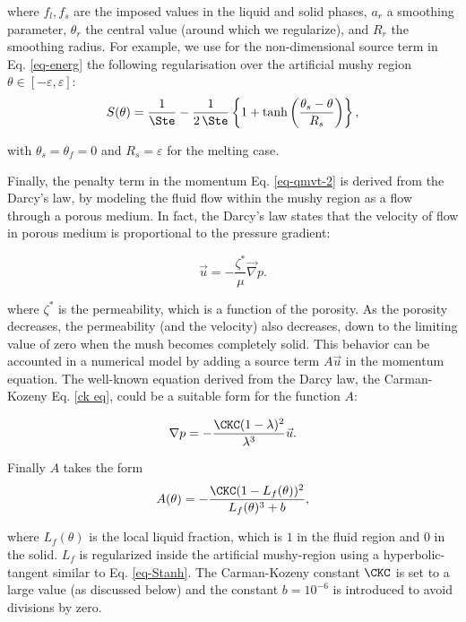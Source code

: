 \noindent where $f_l, f_s$ are the imposed values in the liquid and solid phases, $a_r$ a smoothing  parameter, $\theta_r$ the central value (around which we regularize), and $R_r$ the smoothing radius. For example, we use for the non-dimensional source term in Eq. \ref{eq-energ} the following regularisation over the artificial mushy region $\theta \in [-\varepsilon, \varepsilon]$:
\begin{equation}
S(\theta) = \frac{1}{\Ste} - \frac{1}{2\,\Ste}\left\{
1 + \tanh\left(\frac{\theta_s-\theta}{R_s}\right)
\right\},
\label{eq-Stanh}
\end{equation} 

\noindent with $\theta_s=\theta_f=0$ and $R_s=\varepsilon$ for the melting case. 

Finally, the penalty term in the momentum Eq. \ref{eq-qmvt-2} is derived from the Darcy's law, by modeling the fluid flow within the mushy region as a flow through a porous medium.
In fact, the Darcy's law states that the velocity of flow in porous medium is proportional to the pressure gradient:

\begin{equation}
	\vec u = - \frac{\zeta^*}{\mu} \vec \nabla p.
\end{equation}

\noindent where $\zeta^*$ is the permeability, which is a function of the porosity.
As the porosity decreases, the permeability (and the velocity) also decreases, down to the limiting value of zero when the mush becomes completely solid.
This behavior can be accounted in a numerical model by adding a source term $A \vec u$ in the momentum equation.
The well-known equation derived from the Darcy law, the Carman-Kozeny Eq. \ref{ck eq}, could be a suitable form for the function $A$:

\begin{equation} \label{ck eq}
	\nabla p = - \frac{\CKC (1 - \lambda)^2}{\lambda^3} \vec u.
\end{equation}

\noindent Finally $A$ takes the form \citep{Belhamadia2012,kheirabadi2015effect}
\begin{equation}\label{eq-CK}
A(\theta) = -\frac{\CKC (1 - L_f(\theta))^2}{L_f(\theta)^3 + b}, 
\end{equation}

\noindent where $L_f(\theta)$ is the local liquid fraction, which is  $1$ in the fluid region and  $0$ in the solid. $L_f$ is regularized inside the artificial  mushy-region using a hyperbolic-tangent similar to Eq. \ref{eq-Stanh}.
The Carman-Kozeny constant $\CKC$ is set to a  large value (as discussed below) and  the constant $b=10^{-6}$ is introduced to avoid divisions by zero.

